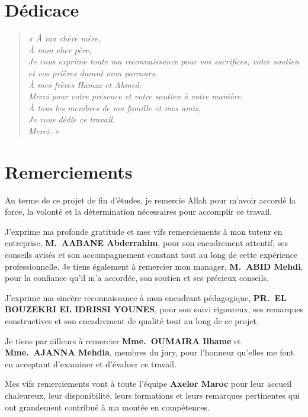 \documentclass[a4paper,12pt]{article}
\begin{document}
\section*{Dédicace}
\begin{quote}
\textit{«
À ma chère mère,\\
À mon cher père,\\
Je vous exprime toute ma reconnaissance pour vos sacrifices, votre soutien et vos prières durant mon parcours.\\
À mes frères Hamza et Ahmed,\\
Merci pour votre présence et votre soutien à votre manière.\\
À tous les membres de ma famille et mes amis,\\
Je vous dédie ce travail.\\
Merci.
»}
\end{quote}

\newpage
\section*{Remerciements}

Au terme de ce projet de fin d'études, je remercie Allah pour m'avoir accordé la force, la volonté et la détermination nécessaires pour accomplir ce travail.

J'exprime ma profonde gratitude et mes vifs remerciements à mon tuteur en entreprise, \textbf{M.~AABANE Abderrahim}, pour son encadrement attentif, ses conseils avisés et son accompagnement constant tout au long de cette expérience professionnelle. Je tiens également à remercier mon manager, \textbf{M.~ABID Mehdi}, pour la confiance qu'il m'a accordée, son soutien et ses précieux conseils.

J'exprime ma sincère reconnaissance à mon encadrant pédagogique, \textbf{PR.~EL BOUZEKRI EL IDRISSI YOUNES}, pour son suivi rigoureux, ses remarques constructives et son encadrement de qualité tout au long de ce projet.

Je tiens par ailleurs à remercier \textbf{Mme.~OUMAIRA Ilhame} et \textbf{Mme.~AJANNA Mehdia}, membres du jury, pour l'honneur qu'elles me font en acceptant d'examiner et d'évaluer ce travail.

Mes vifs remerciements vont à toute l'équipe \textbf{Axelor Maroc} pour leur accueil chaleureux, leur disponibilité, leurs formations et leurs remarques pertinentes qui ont grandement contribué à ma montée en compétences.
\end{document}
